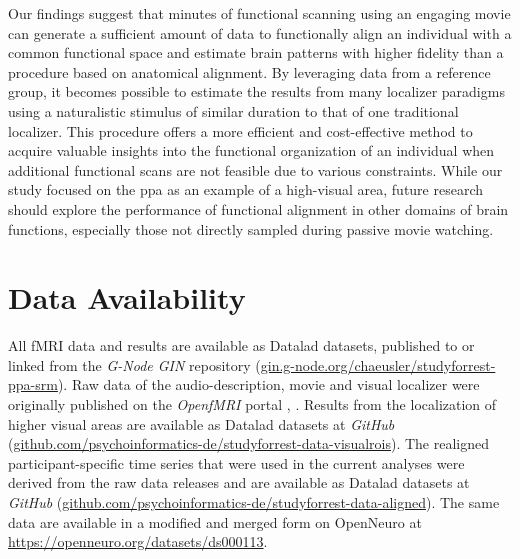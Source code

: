 %
Our findings suggest that \unit[15]{minutes} of functional scanning using an
engaging movie can generate a sufficient amount of data to functionally align an
individual with a common functional space and estimate brain patterns with
higher fidelity than a procedure based on anatomical alignment.
%
By leveraging data from a reference group, it becomes possible to estimate
the results from many localizer paradigms using a naturalistic stimulus of
similar duration to that of one traditional localizer.
%
This procedure offers a more efficient and cost-effective method to acquire
valuable insights into the functional organization of an individual when
additional functional scans are not feasible due to various constraints.
%
While our study focused on the \ac{ppa} as an example of a high-visual area,
future research should explore the performance of functional alignment in other
domains of brain functions, especially those not directly sampled during passive
movie watching.


\section*{Data Availability}


All fMRI data and results are available as Datalad \citep{halchenko2021datalad}
datasets, published to or linked from the \emph{G-Node GIN} repository
(\href{https://gin.g-node.org/chaeusler/studyforrest-ppa-srm}{\url{gin.g-node.org/chaeusler/studyforrest-ppa-srm}}).
Raw data of the audio-description, movie and visual localizer were originally
published on the \emph{OpenfMRI} portal
\citep[\url{https://legacy.openfmri.org/dataset/ds000113},][]
{Hanke2014ds000113}, \space
\citep[\url{https://legacy.openfmri.org/dataset/ds000113d},][]
{hanke2016ds000113d}.
Results from the localization of higher visual areas are available as Datalad
datasets at \emph{GitHub}
(\href{https://github.com/psychoinformatics-de/studyforrest-data-visualrois}{\url{github.com/psychoinformatics-de/studyforrest-data-visualrois}}).
The realigned participant-specific time series that were used in the current
analyses were derived from the raw data releases and are available as Datalad
datasets at \emph{GitHub}
(\href{https://github.com/psychoinformatics-de/studyforrest-data-aligned}{\url{github.com/psychoinformatics-de/studyforrest-data-aligned}}).
The same data are available in a modified and merged form on OpenNeuro at
\url{https://openneuro.org/datasets/ds000113}.


